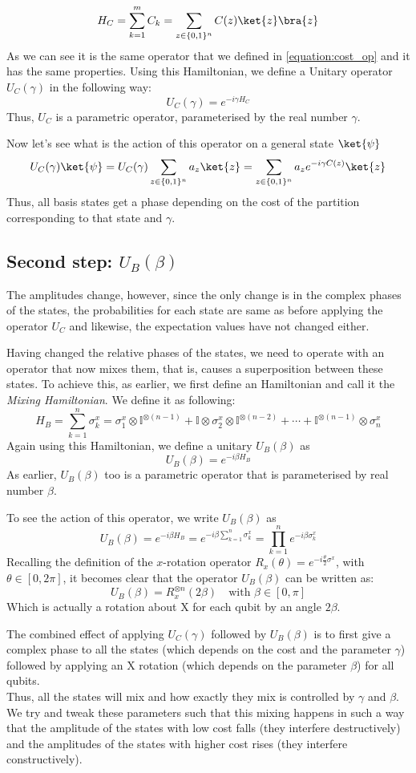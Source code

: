 \[
    H_C = \sum_{k=1}^m C_k = \sum_{z \in \{0, 1\}^n}C(z)\ket{z}\bra{z}
\]
As we can see it is the same operator that we defined in \ref{equation:cost_op} and it has the same properties.
Using this Hamiltonian, we define a Unitary operator $U_C(\gamma)$ in the following way:
$$U_C(\gamma) = e^{-i \gamma H_C}$$
Thus, $U_C$ is a parametric operator, parameterised by the real number $\gamma$.

Now let's see what is the action of this operator on a general state $\ket{\psi}$
\[
    U_C(\gamma)\ket{\psi}= U_C(\gamma)\sum_{z \in\{0,1\}^n} a_z\ket{z} = \sum_{z \in\{0,1\}^n} a_z e^{-i\gamma C(z)} \ket{z}
\]
Thus, all basis states get a phase depending on the cost of the partition corresponding to that state and $\gamma$.
\subsection{Second step: $U_B(\beta)$}
The amplitudes change, however, since the only change is in the complex phases of the states, the probabilities for each state are same as before applying the operator $U_C$ and likewise, the expectation values have not changed either.

Having changed the relative phases of the states, we need to operate with an operator that now mixes them, that is, causes a superposition between these states.
To achieve this, as earlier, we first define an Hamiltonian and call it the \textit{Mixing Hamiltonian}.
We define it as following:
\[
    H_B=\sum_{k=1}^n\sigma_k^x= \sigma_1^x\otimes \mathbb{I}^{\otimes(n-1)} + \mathbb{I} \otimes \sigma_2^x \otimes \mathbb{I}^{ \otimes(n-2)}+ \cdots + \mathbb{I}^{\otimes(n-1)} \otimes \sigma_n^x
\]
Again using this Hamiltonian, we define a unitary $U_B(\beta)$ as
$$U_B(\beta)= e^{-i\beta H_B}$$
As earlier, $U_B(\beta)$ too is a parametric operator that is parameterised by real number $\beta$.

To see the action of this operator, we write $U_B(\beta)$ as
\[
    U_B(\beta)= e^{-i\beta H_B} = e^{-i\beta\sum_{k=1}^n \sigma_k^x} = \prod_{k=1}^n e^{-i\beta \sigma_k^x}
\]
Recalling the definition of the $x$-rotation operator $R_x(\theta)=e^{-i\frac{\theta}{2}\sigma^x}$, with $\theta\in [0,2\pi]$, it becomes clear that the operator $U_B(\beta)$ can be written as:
\[
    U_B(\beta)= R_x^{\otimes n}(2\beta)\quad\text{with }\beta\in [0,\pi]
\]
Which is actually a rotation about X for each qubit by an angle $2\beta$.

The combined effect of applying $U_C(\gamma)$ followed by $U_B(\beta)$ is to first give a complex phase to all the states (which depends on the cost and the parameter $\gamma$) followed by applying an X rotation (which depends on the parameter $\beta$) for all qubits.\\
Thus, all the states will mix and how exactly they mix is controlled by $\gamma$ and $\beta$.
We try and tweak these parameters such that this mixing happens in such a way that the amplitude of the states with low cost falls (they interfere destructively) and the amplitudes of the states with higher cost rises (they interfere constructively).

